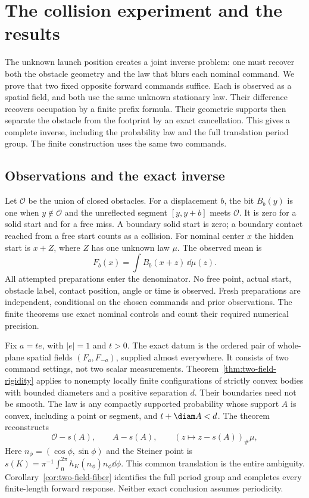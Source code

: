 \section{The collision experiment and the results}
\label{sec:two-field-introduction}
The unknown launch position creates a joint inverse problem: one must
recover both the obstacle geometry and the law that blurs each nominal
command. We prove that two fixed opposite forward commands suffice.
Each is observed as a spatial field, and both use the same unknown
stationary law. Their difference recovers occupation by a finite
prefix formula. Their geometric supports then separate the obstacle
from the footprint by an exact cancellation. This gives a complete
inverse, including the probability law and the full translation
period group. The finite construction uses the same two commands.

\subsection{Observations and the exact inverse}
Let $\mathcal O$ be the union of closed obstacles. For a displacement
$b$, the bit $B_b(y)$ is one when $y\notin\mathcal O$ and the
unreflected segment $[y,y+b]$ meets $\mathcal O$. It is zero for a
solid start and for a free miss. A boundary solid start is zero; a
boundary contact reached from a free start counts as a collision.
For nominal center $x$ the hidden start is $x+Z$, where $Z$ has one
unknown law $\mu$. The observed mean is
\[
                 F_b(x)=\int B_b(x+z)\,\dd\mu(z).
\]
All attempted preparations enter the denominator. No free point,
actual start, obstacle label, contact position, angle or time is
observed. Fresh preparations are independent, conditional on the
chosen commands and prior observations. The finite theorems use exact
nominal controls and count their required numerical precision.

Fix $a=te$, with $|e|=1$ and $t>0$. The exact datum is the ordered
pair of whole-plane spatial fields $(F_a,F_{-a})$, supplied almost
everywhere. It consists of two command settings, not two scalar
measurements. Theorem~\ref{thm:two-field-rigidity} applies to nonempty
locally finite configurations of strictly convex bodies with bounded
diameters and a positive separation $d$. Their boundaries need not
be smooth. The law is any compactly supported probability whose
support $A$ is convex, including a point or segment, and
$t+\diam A<d$. The theorem reconstructs
\[
       \mathcal O-s(A),\qquad A-s(A),\qquad
                   (z\mapsto z-s(A))_\#\mu,
\]
Here $n_\phi=(\cos\phi,\sin\phi)$ and the Steiner point is
$s(K)=\pi^{-1}\int_0^{2\pi}h_K(n_\phi)n_\phi\dd\phi$. This common translation is the
entire ambiguity. Corollary~\ref{cor:two-field-fiber} identifies the
full period group and completes every finite-length forward response.
Neither exact conclusion assumes periodicity.

